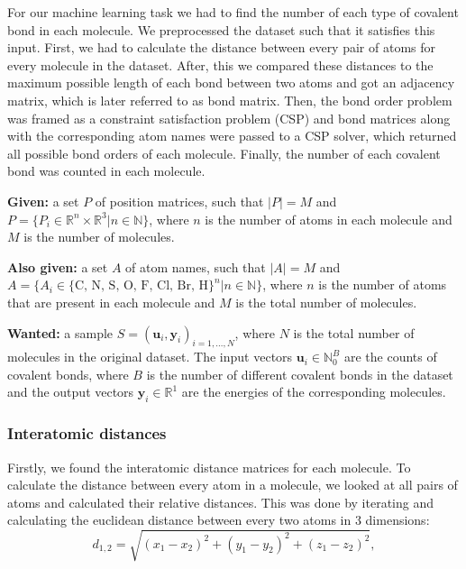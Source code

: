

For our machine learning task we had to find the number of each type of covalent bond in each molecule. We preprocessed the dataset such that it satisfies this input. First, we had to calculate the distance between every pair of atoms for every molecule in the dataset. After, this we compared these distances to the maximum possible length of each bond between two atoms and got an adjacency matrix, which is later referred to as bond matrix. Then, the bond order problem was framed as a constraint satisfaction problem (CSP) and bond matrices along with the corresponding atom names were passed to a CSP solver, which returned all possible bond orders of each molecule. Finally, the number of each covalent bond was counted in each molecule.

\textbf{Given:} a set $P$ of position matrices, such that $|P| = M$ and $P = \{ P_i \in \mathbb{R}^n \times \mathbb{R}^3 | n \in \mathbb{N} \}$, where $n$ is the number of atoms in each molecule and $M$ is the number of molecules.

\textbf{Also given:} a set $A$ of atom names, such that $|A| = M$ and $A = \{ A_i \in \{\text{C, N, S, O, F, Cl, Br, H}\}^n| n \in \mathbb{N} \}$, where $n$ is the number of atoms that are present in each molecule and $M$ is the total number of molecules.

\textbf{Wanted:} a sample $S = (\textbf{u}_i, \textbf{y}_i)_{i=1, \dots, N}$, where $N$ is the total number of molecules in the original dataset. The input vectors $\textbf{u}_i \in \mathbb{N}_0^B$ are the counts of covalent bonds, where $B$ is the number of different covalent bonds in the dataset and the output vectors $\textbf{y}_i \in \mathbb{R}^1$ are the energies of the corresponding molecules.

\subsubsection{Interatomic distances}

Firstly, we found the interatomic distance matrices for each molecule. To calculate the distance between every atom in a molecule, we looked at all pairs of atoms and calculated their relative distances. This was done by iterating and calculating the euclidean distance between every two atoms in 3 dimensions: 
\begin{equation}
    \label{eqn:euclidean-distance}
    d_{1, 2} = \sqrt{(x_1-x_2)^2 + (y_1-y_2)^2 + (z_1-z_2)^2},
\end{equation}

